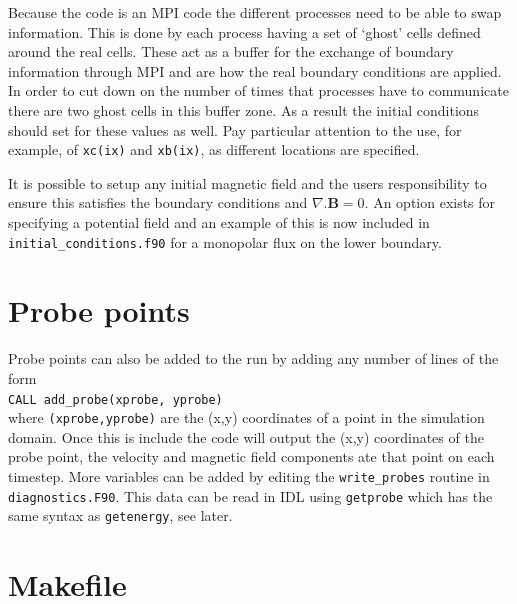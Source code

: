 \documentclass[11pt]{article}
\begin{document}
Because the code is an MPI code the different processes need to be able to swap information. This is done by each 
process having a set of `ghost' cells defined around the real cells. These act as a buffer for the exchange of 
boundary information through MPI and are how the real boundary conditions are applied. In order to cut down on the 
number of times that processes have to communicate there are two ghost cells in this buffer zone. As a result the 
initial conditions should set for these values as well.
Pay particular attention to the use, for example, of \texttt{xc(ix)} and \texttt{xb(ix)}, as different locations are specified.

It is possible to setup any initial magnetic field and the users responsibility to ensure this satisfies the boundary conditions
and $\nabla.\mathbf{B}=0$. An option exists for specifying a potential field and an example of this is now included
in \texttt{initial\_conditions.f90} for a monopolar flux on the lower boundary.


\section{Probe points}
Probe points can also be added to the run by adding any number of lines of the form\\
\texttt{CALL add\_probe(xprobe, yprobe)}\\
where \texttt{(xprobe,yprobe)} are the (x,y) coordinates of a point in the simulation domain. 
Once this is include the code will output the (x,y) coordinates of the probe point, the velocity 
and magnetic field components ate that point on each timestep. More variables can be added by
editing the \texttt{write\_probes} routine in \texttt{diagnostics.F90}. This data can be read in IDL
using \texttt{getprobe} which has the same syntax as \texttt{getenergy}, see later.


\section{Makefile}
\end{document}
